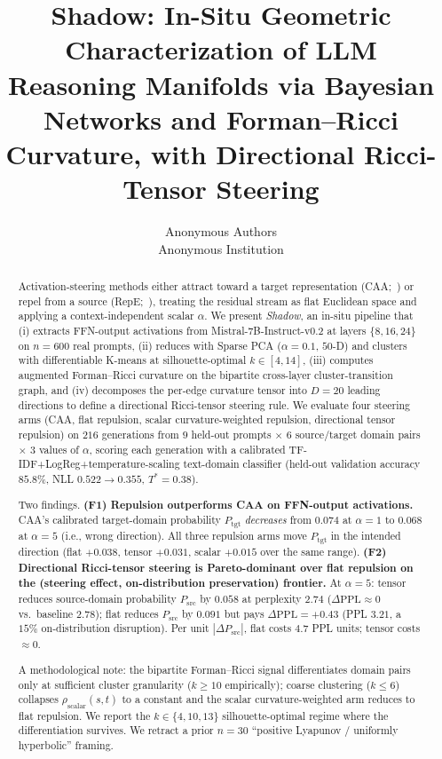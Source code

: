\documentclass[10pt,twocolumn]{article}
\title{\textbf{Shadow: In-Situ Geometric Characterization of LLM Reasoning Manifolds via Bayesian Networks and Forman--Ricci Curvature, with Directional Ricci-Tensor Steering}}
\author{Anonymous Authors\\Anonymous Institution}
\date{}
\begin{document}
\twocolumn[
\begin{@twocolumnfalse}
\maketitle
\end{@twocolumnfalse}
]

\begin{abstract}
Activation-steering methods either attract toward a target representation (CAA;~\citealp{panickssery2023steering}) or repel from a source (RepE;~\citealp{zou2023representation}), treating the residual stream as flat Euclidean space and applying a context-independent scalar $\alpha$. We present \emph{Shadow}, an in-situ pipeline that (i) extracts FFN-output activations from Mistral-7B-Instruct-v0.2 at layers $\{8,16,24\}$ on $n{=}600$ real prompts, (ii) reduces with Sparse PCA ($\alpha{=}0.1$, $50$-D) and clusters with differentiable K-means at silhouette-optimal $k\in[4,14]$, (iii) computes augmented Forman--Ricci curvature on the bipartite cross-layer cluster-transition graph, and (iv) decomposes the per-edge curvature tensor into $D{=}20$ leading directions to define a directional Ricci-tensor steering rule. We evaluate four steering arms (CAA, flat repulsion, scalar curvature-weighted repulsion, directional tensor repulsion) on $216$ generations from $9$ held-out prompts $\times$ $6$ source/target domain pairs $\times$ $3$ values of $\alpha$, scoring each generation with a calibrated TF-IDF+LogReg+temperature-scaling text-domain classifier (held-out validation accuracy $85.8\%$, NLL $0.522\to 0.355$, $T^*{=}0.38$).

Two findings.
\textbf{(F1) Repulsion outperforms CAA on FFN-output activations.} CAA's calibrated target-domain probability $P_{\text{tgt}}$ \emph{decreases} from $0.074$ at $\alpha{=}1$ to $0.068$ at $\alpha{=}5$ (i.e., wrong direction). All three repulsion arms move $P_{\text{tgt}}$ in the intended direction (flat $+0.038$, tensor $+0.031$, scalar $+0.015$ over the same range).
\textbf{(F2) Directional Ricci-tensor steering is Pareto-dominant over flat repulsion on the (steering effect, on-distribution preservation) frontier.} At $\alpha{=}5$: tensor reduces source-domain probability $P_{\text{src}}$ by $0.058$ at perplexity $2.74$ ($\Delta\text{PPL}{\approx}0$ vs.\ baseline $2.78$); flat reduces $P_{\text{src}}$ by $0.091$ but pays $\Delta\text{PPL}{=}+0.43$ (PPL $3.21$, a $15\%$ on-distribution disruption). Per unit $|\Delta P_{\text{src}}|$, flat costs $4.7$ PPL units; tensor costs ${\approx}0$.

A methodological note: the bipartite Forman--Ricci signal differentiates domain pairs only at sufficient cluster granularity ($k{\geq}10$ empirically); coarse clustering ($k{\leq}6$) collapses $\rho_{\text{scalar}}(s,t)$ to a constant and the scalar curvature-weighted arm reduces to flat repulsion. We report the $k\in\{4,10,13\}$ silhouette-optimal regime where the differentiation survives. We retract a prior $n{=}30$ ``positive Lyapunov / uniformly hyperbolic'' framing.
\end{abstract}
\end{document}
